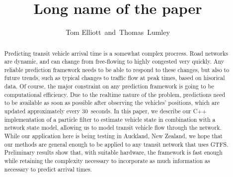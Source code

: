 \documentclass[times, doublespace]{anzsauth}
\begin{document}
\cleanlookdateon
{}
\title{Long name of the paper}
\author{Tom Elliott\corrauth~and~Thomas~Lumley}
\address{
    Department of Statistics, University of Auckland, 
    Auckland 1142, New Zealand\\
    Email: \texttt{tom.elliott@auckland.ac.nz}
}

\begin{abstract}
Predicting transit vehicle arrival time is a somewhat complex procress.
Road networks are dynamic, and can change from free-flowing to highly congested
very quickly.
Any reliable prediction framework needs to be able to respond to these changes,
but also to future trends, such as typical changes to traffic flow
at peak times, based on hisorical data.
Of course, the major constraint on any prediction framework is going to be
computational efficiency.
Due to the realtime nature of the problem, predictions need to be 
available as soon as possible after observing the vehicles' positions,
which are updated approximately every 30~seconds.
In this paper, we describe our C++ implementation of a particle filter to estimate
vehicle state in combination with a network state model,
allowing us to model transit vehicle flow through the network.
While our application here is being testing in Auckland, New Zealand,
we hope that our methods are general enough to be applied to any
transit network that uses GTFS.
Preliminary results show that, with suitable hardware,
the framework is fast enough while retaining the complexity necessary
to incorporate as much information as necessary to predict arrival times.
\end{abstract}


\maketitle




% 



\end{document}
